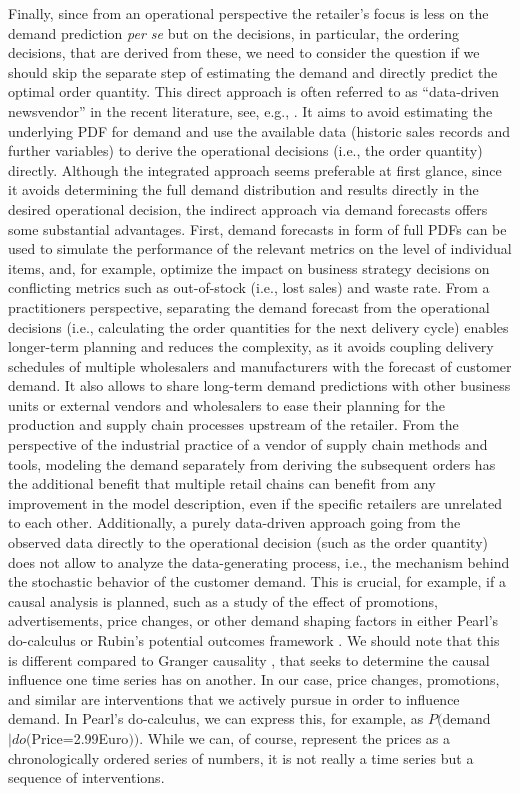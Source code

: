 \documentclass[BCOR=1mm, DIV=calc,10pt,
twoside=true,
twocolumn,
headings=normal]{scrartcl}
\begin{document}
Finally, since from an operational perspective the retailer's focus is less on the demand prediction {\em per se} but on the decisions, in particular, the ordering decisions, that are derived from these, we need to consider the question if we should skip the separate step of estimating the demand and directly predict the optimal order quantity. This direct approach is often referred to as ``data-driven newsvendor'' in the recent literature, see, e.g., \cite{beutel2012safety, ban2019big, bertsimas2020predictive, oroojlooyjadid2020applying,huber2019data}. It aims to avoid estimating the underlying PDF for demand and use the available data (historic sales records and further variables)  to derive the operational decisions (i.e., the order quantity) directly. Although the integrated approach seems preferable at first glance, since it avoids determining the full demand distribution and results directly in the desired operational decision, the indirect approach via demand forecasts offers some substantial advantages. First, demand forecasts in form of full PDFs can be used to simulate the performance of the relevant metrics on the level of individual items, and, for example, optimize the impact on business strategy decisions on conflicting metrics such as out-of-stock (i.e., lost sales) and waste rate. From a practitioners perspective, separating the demand forecast from the operational decisions (i.e., calculating the order quantities for the next delivery cycle) enables longer-term planning and reduces the complexity, as it avoids coupling delivery schedules of multiple wholesalers and manufacturers with the forecast of customer demand. It also allows to share long-term demand predictions with other business units or external vendors and wholesalers to ease their planning for the production and supply chain processes upstream of the retailer. From the perspective of the industrial practice of a vendor of supply chain methods and tools, modeling the demand separately from deriving the subsequent orders has the additional benefit that multiple retail chains can benefit from any improvement in the model description, even if the specific retailers are unrelated to each other. Additionally, a purely data-driven approach going from the observed data directly to the operational decision (such as the order quantity) does not allow to analyze the data-generating process, i.e., the mechanism behind the stochastic behavior of the customer demand. This is crucial, for example, if a causal analysis is planned, such as a study of the effect of promotions, advertisements, price changes, or other demand shaping factors in either Pearl's do-calculus \cite{PearlCausality} or Rubin's potential outcomes framework \cite{rubin1974estimating}. We should note that this is different compared to Granger causality \cite{Granger1969}, that seeks to determine the causal influence one time series has on another. In our case, price changes, promotions, and similar are interventions that we actively pursue in order to influence demand. In Pearl's do-calculus, we can express this, for example, as $P($demand $|do ($Price=2.99Euro$))$. While we can, of course, represent the prices as a chronologically ordered series of numbers, it is not really a time series but a sequence of interventions. 
\end{document}
